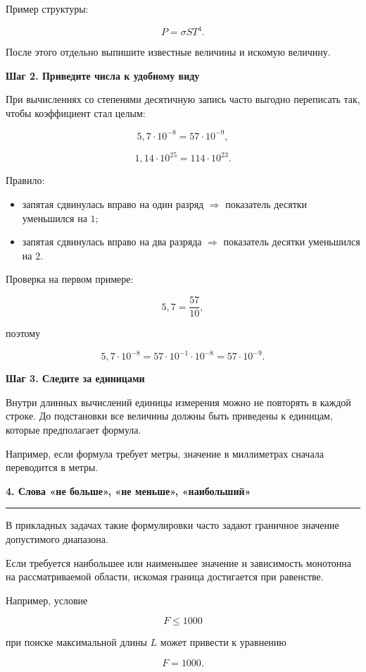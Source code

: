 \documentclass[a4paper,12pt]{article}
\newcommand{\topic}[1]{%
  \vspace{0.5em}
  {\Large\bfseries\color{darkaccent}#1}\par
  \vspace{0.25em}
  {\color{accent}\rule{\linewidth}{0.7pt}}\par
  \vspace{0.6em}
}
\newcommand{\subtopic}[1]{%
  \vspace{0.5em}
  {\large\bfseries\color{darkaccent}#1}\par
  \vspace{0.25em}
}
\begin{document}
Пример структуры:

\[
P=\sigma ST^4.
\]

После этого отдельно выпишите известные величины и искомую величину.

\subtopic{Шаг 2. Приведите числа к удобному виду}

При вычислениях со степенями десятичную запись часто выгодно
переписать так, чтобы коэффициент стал целым:

\[
5{,}7\cdot10^{-8}
=
57\cdot10^{-9},
\]

\[
1{,}14\cdot10^{25}
=
114\cdot10^{23}.
\]

Правило:

\begin{itemize}
  \item запятая сдвинулась вправо на один разряд
  \(\Rightarrow\) показатель десятки уменьшился на \(1\);
  \item запятая сдвинулась вправо на два разряда
  \(\Rightarrow\) показатель десятки уменьшился на \(2\).
\end{itemize}

Проверка на первом примере:

\[
5{,}7=\frac{57}{10},
\]

поэтому

\[
5{,}7\cdot10^{-8}
=
57\cdot10^{-1}\cdot10^{-8}
=
57\cdot10^{-9}.
\]

\subtopic{Шаг 3. Следите за единицами}

Внутри длинных вычислений единицы измерения можно не повторять
в каждой строке. До подстановки все величины должны быть приведены
к единицам, которые предполагает формула.

Например, если формула требует метры, значение в миллиметрах
сначала переводится в метры.

\topic{4. Слова «не больше», «не меньше», «наибольший»}

В прикладных задачах такие формулировки часто задают граничное
значение допустимого диапазона.

Если требуется наибольшее или наименьшее значение и зависимость
монотонна на рассматриваемой области, искомая граница достигается
при равенстве.

Например, условие

\[
F\le1000
\]

при поиске максимальной длины \(L\) может привести к уравнению

\[
F=1000.
\]
\end{document}
